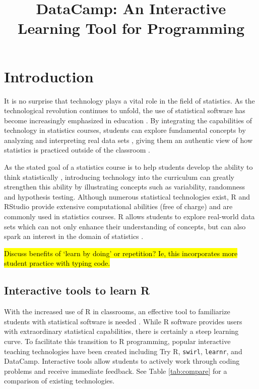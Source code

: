\documentclass{tise_style_doi}
\title{DataCamp: An Interactive Learning Tool for Programming}
\begin{document}
\maketitle

\section{Introduction}


It is no surprise that technology plays a vital role in the field of statistics. As
the technological revolution continues to unfold, the use of statistical software
has become increasingly emphasized in education \citep{AmericanStatisticalAssociation2016}.
By integrating the capabilities of technology in statistics courses, students can
explore fundamental concepts by analyzing and interpreting real data sets
\citep{Chance2007, Hardin2015, Horton2014}, giving them an authentic view of how statistics
is practiced outside of the classroom \citep{Wang2017}.

As the stated goal of a statistics course is to help students develop the ability to think
statistically \citep{AmericanStatisticalAssociation2016}, introducing technology into
the curriculum can greatly strengthen this ability by illustrating concepts such as
variability, randomness and hypothesis testing. Although numerous statistical technologies
exist, R and RStudio provide extensive computational abilities (free of charge) and are
commonly used in statistics courses. R allows students to explore real-world data sets which
can not only enhance their understanding of concepts, but can also spark an interest in the
domain of statistics \citep{Wang2017}.

\hl{Discuss benefits of `learn by doing' or repetition?  Ie, this incorporates
more student practice with typing code.}

\subsection{Interactive tools to learn R}

With the increased use of R in classrooms, an effective tool to familiarize students
with statistical software is needed \citep{Baumer2014}. While R software provides users
with extraordinary statistical capabilities, there is certainly a steep learning curve.
To facilitate this transition to R programming, popular interactive teaching technologies
have been created including Try R, \texttt{swirl}, \texttt{learnr}, and DataCamp.
Interactive tools allow students to actively work through coding problems and receive
immediate feedback.  See Table \ref{tab:compare} for a comparison of existing
technologies.
\end{document}
